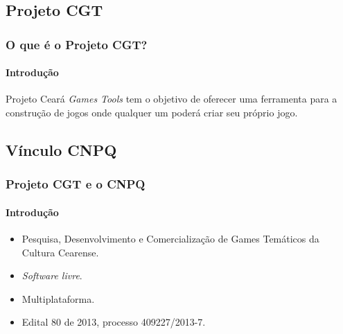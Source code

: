 \documentclass[]{beamer}
\begin{document}
   \subsection{Projeto CGT}
   \begin{frame}
      \frametitle{O que é o Projeto CGT?}
      \framesubtitle{Introdução}
      Projeto Ceará \emph{Games Tools} tem o objetivo de oferecer uma ferramenta para a construção de jogos onde qualquer um poderá criar seu próprio jogo. \cite{website:projeto-cgt}
   \end{frame}
   \subsection{Vínculo CNPQ}
   \begin{frame}
      \frametitle{Projeto CGT e o CNPQ}
      \framesubtitle{Introdução}
      \begin{itemize}
         \item Pesquisa, Desenvolvimento e Comercialização de Games Temáticos da Cultura Cearense.
         \item \emph{Software livre}.
         \item Multiplataforma.
         \item Edital 80 de 2013, processo 409227/2013-7.
      \end{itemize}
   \end{frame}
\end{document}
